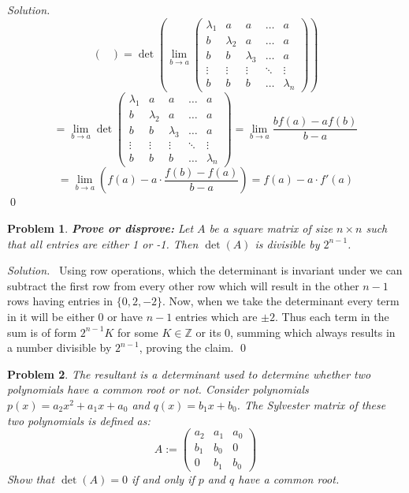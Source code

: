\documentclass[12pt,a4paper]{article}
\newenvironment{solution}{%
  \par\noindent\textit{Solution.}\ }{\qed}
\theoremstyle{problemstyle}
\newtheorem{problem}{Problem}[section]
\def\bZ{\mathbb{Z}}
\begin{document}
\begin{solution}
$$\begin{pmatrix}
    \end{pmatrix}=\det\left(\lim_{b\to a}\begin{pmatrix}
    \lambda_1 & a & a & \dots & a \\
    b & \lambda_2 & a & \dots & a \\
    b & b & \lambda_3 & \dots & a \\
    \vdots & \vdots & \vdots & \ddots & \vdots \\
    b & b & b & \dots & \lambda_n
    \end{pmatrix}\right)$$
    $$=\lim_{b\to a}\det\begin{pmatrix}
    \lambda_1 & a & a & \dots & a \\
    b & \lambda_2 & a & \dots & a \\
    b & b & \lambda_3 & \dots & a \\
    \vdots & \vdots & \vdots & \ddots & \vdots \\
    b & b & b & \dots & \lambda_n
    \end{pmatrix}=\lim_{b\to a}\frac{bf(a)-af(b)}{b-a}$$
    $$=\lim_{b\to a}\left(f(a)-a\cdot\frac{f(b)-f(a)}{b-a}\right)=f(a)-a\cdot f'(a)$$
\end{solution}
\begin{problem}\label{prob:1.8}
    \textbf{Prove or disprove:} Let $A$ be a square matrix of size $n \times n$ such that all entries are either 1 or -1. Then $\det(A)$ is divisible by $2^{n-1}$.
\end{problem}
\begin{solution}
    Using row operations, which the determinant is invariant under we can subtract the first row from every other row which will result in the other $n-1$ rows having entries in $\{0,2,-2\}$. 
    Now, when we take the determinant every term in it will be either $0$ or have $n-1$ entries which are $\pm 2$. 
    Thus each term in the sum is of form $2^{n-1}K$ for some $K\in\bZ$ or its $0$, summing which always results in a number divisible by $2^{n-1}$, proving the claim.
\end{solution}
\begin{problem}\label{prob:1.9}
    The resultant is a determinant used to determine whether two polynomials have a common root or not. Consider polynomials $p(x) = a_2x^2 + a_1x + a_0$ and $q(x) = b_1x + b_0$. The Sylvester matrix of these two polynomials is defined as:
    \[
    A := \begin{pmatrix}
    a_2 & a_1 & a_0 \\
    b_1 & b_0 & 0 \\
    0 & b_1 & b_0
    \end{pmatrix}
    \]
    Show that $\det(A) = 0$ if and only if $p$ and $q$ have a common root.
\end{problem}
\end{document}
